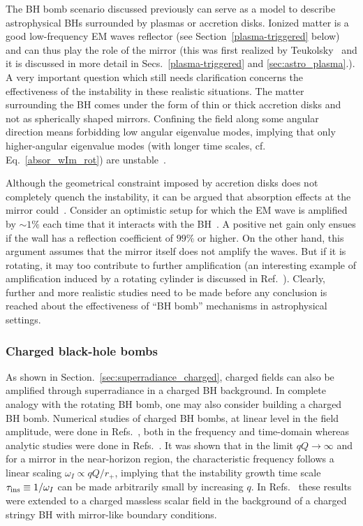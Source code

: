 \documentclass[11pt]{article}
\numberwithin{equation}{section} %
\begin{document}
The BH bomb scenario discussed previously can serve as a model to describe astrophysical BHs surrounded by plasmas or 
accretion disks. Ionized matter is a good low-frequency EM waves reflector (see Section~\ref{plasma-triggered} below) 
and can thus play the role of the mirror (this was first realized by Teukolsky~\cite{teukolskythesis} and it is 
discussed in more detail in Secs.~\ref{plasma-triggered} and \ref{sec:astro_plasma}.). A very important question which 
still needs clarification concerns the effectiveness of the instability in these realistic situations. The matter 
surrounding the BH comes under the form of thin or thick accretion disks and not as spherically shaped mirrors. 
Confining the field along some angular direction means forbidding low angular eigenvalue modes, implying that only 
higher-angular eigenvalue modes (with longer time scales, cf. Eq.~\eqref{absor_wIm_rot}) are 
unstable~\cite{Putten,Aguirre:1999zn}.

Although the geometrical constraint imposed by accretion disks does not completely quench the instability, it can be 
argued that absorption effects at the mirror could~\cite{Aguirre:1999zn}. Consider an optimistic setup for which the EM 
wave is amplified by $\sim 1\%$ each time that it interacts with the BH~\cite{Teukolsky:1974yv}. A positive net gain 
only ensues if the wall has a reflection coefficient of $99\%$ or higher. 
On the other hand, this argument assumes that the mirror itself does not amplify the waves. But if it is rotating, it may too contribute to further amplification (an interesting example of amplification induced by a rotating cylinder is discussed in Ref.~\cite{Bekenstein:1998nt}).
Clearly, further and more realistic studies need to be made before any conclusion is reached about the effectiveness of ``BH bomb'' mechanisms in astrophysical settings.

\subsubsection{Charged black-hole bombs}\label{sec:chargedbombs}
 
As shown in Section.~\ref{sec:superradiance_charged}, charged fields can also be amplified through superradiance in a charged BH background. In complete analogy with the rotating BH bomb, one may also consider building a charged BH bomb. Numerical studies of charged BH bombs, at linear level in the field amplitude, were done in Refs.~\cite{Herdeiro:2013pia,Degollado:2013bha,Dias:2018zjg}, both in the frequency and time-domain whereas analytic studies were done in Refs.~\cite{Hod:2013fvl,Li:2014gfg}. It was shown that in the limit $q Q\to\infty$ and for a mirror in the near-horizon region, the characteristic frequency follows a linear scaling $\omega_I\propto q Q/r_+$, implying that the instability growth time scale $\tau_{\rm ins}\equiv 1/\omega_I$ can be made arbitrarily small by increasing $q$. In Refs.~\cite{Li:2014fna,Li:2015mqa} these results were extended to a charged massless scalar field in the background of a charged 
stringy BH with mirror-like boundary conditions.
\end{document}
